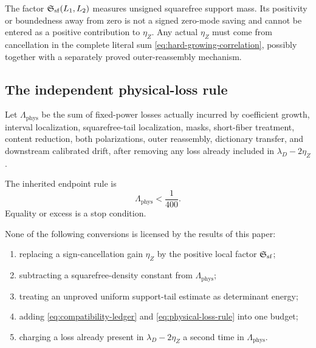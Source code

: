 \begin{remark}
\label{rem:local-density-not-saving}
The factor \(\mathfrak S_{\mathrm{sf}}(L_1,L_2)\) measures unsigned squarefree support
mass.  Its positivity or boundedness away from zero is not a signed
zero-mode saving and cannot be entered as a positive contribution to
\(\eta_Z\).  Any actual \(\eta_Z\) must come from cancellation in the
complete literal sum \eqref{eq:hard-growing-correlation}, possibly
together with a separately proved outer-reassembly mechanism.
\end{remark}

\subsection{The independent physical-loss rule}

\begin{definition}
\label{def:physical-loss}
Let \(\Lambda_{\mathrm{phys}}\) be the sum of fixed-power losses
actually incurred by coefficient growth, interval localization,
squarefree-tail localization, masks, short-fiber treatment, content
reduction, both polarizations, outer reassembly, dictionary transfer,
and downstream calibrated drift, after removing any loss already
included in \(\lambda_D-2\eta_Z\).
\end{definition}

The inherited endpoint rule is
\begin{equation}
 \boxed{\Lambda_{\mathrm{phys}}<\frac1{400}.}
\label{eq:physical-loss-rule}
\end{equation}
Equality or excess is a stop condition.

\begin{proposition}
\label{prop:ledgers-independent}
None of the following conversions is licensed by the results of this
paper:
\begin{enumerate}[label=(\roman*),leftmargin=2.2em]
\item replacing a sign-cancellation gain \(\eta_Z\) by the positive
local factor \(\mathfrak S_{\mathrm{sf}}\);
\item subtracting a squarefree-density constant from
\(\Lambda_{\mathrm{phys}}\);
\item treating an unproved uniform support-tail estimate as
determinant energy;
\item adding \eqref{eq:compatibility-ledger} and
\eqref{eq:physical-loss-rule} into one budget;
\item charging a loss already present in
\(\lambda_D-2\eta_Z\) a second time in
\(\Lambda_{\mathrm{phys}}\).
\end{enumerate}
\end{proposition}

